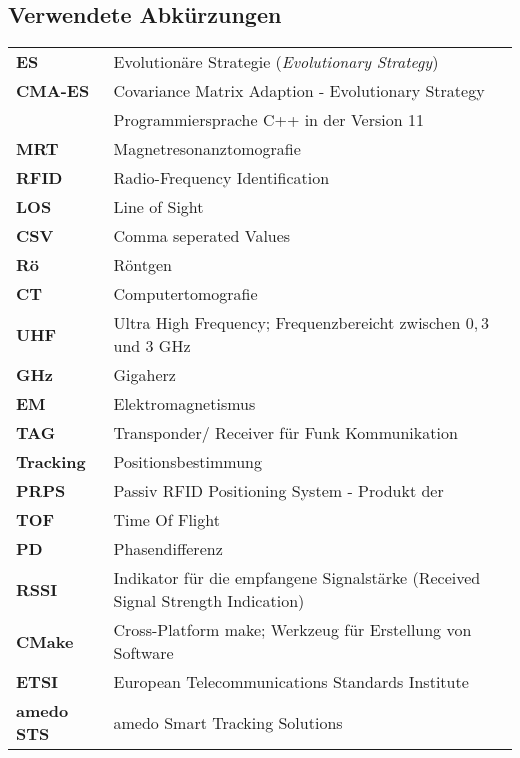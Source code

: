 \newpage
%
\subsection*{Verwendete Abkürzungen}
%
\begin{table} [H]
	\begin{center}
		\begin{tabular}{p{25mm}p{95mm}}
		      	\textbf{ES} & Evolutionäre Strategie (\textit{Evolutionary Strategy})\\
		      	\textbf{CMA-ES}  & Covariance Matrix Adaption - Evolutionary Strategy\\
		      	\textbf{\cpp11} & Programmiersprache C++ in der Version 11\\
		      	\textbf{MRT}	& Magnetresonanztomografie\\
		      	\textbf{RFID} & Radio-Frequency Identification\\
		      	\textbf{LOS} & Line of Sight\\
		      	\textbf{CSV} & Comma seperated Values\\
		      	\textbf{Rö} & Röntgen\\
		      	\textbf{CT} & Computertomografie\\
		      	\textbf{UHF} & Ultra High Frequency; Frequenzbereicht zwischen $0,3$ und $3$ GHz\\
		      	\textbf{GHz} & Gigaherz\\
		      	\textbf{EM} & Elektromagnetismus\\
		      	\textbf{TAG} & Transponder/ Receiver für Funk Kommunikation\\
		      	\textbf{Tracking} & Positionsbestimmung\\
		      	\textbf{PRPS} & Passiv RFID Positioning System - Produkt der \amedogmbh \\
		      	\textbf{TOF} & Time Of Flight\\
		      	\textbf{PD} & Phasendifferenz\\
		      	\textbf{RSSI} & Indikator für die empfangene Signalstärke (Received Signal Strength Indication)\\
		      	\textbf{CMake} & Cross-Platform make; Werkzeug für Erstellung von Software\\
		      	\textbf{ETSI} & European Telecommunications Standards Institute\\
		      	\textbf{amedo STS} & amedo Smart Tracking Solutions\\
%		      	
		\end{tabular}
	\end{center}
\end{table}

